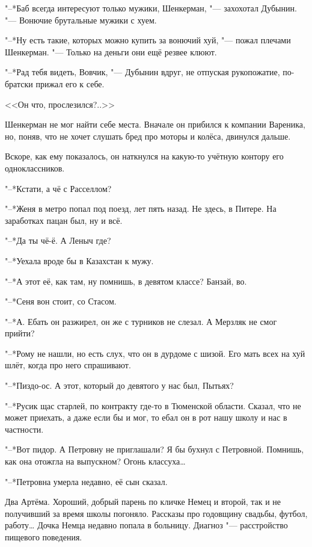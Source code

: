 "--*Баб всегда интересуют только мужики, Шенкерман, "--- захохотал Дубынин.
"--- Вонючие брутальные мужики с хуем.

"--*Ну есть такие, которых можно купить за вонючий хуй, "--- пожал плечами Шенкерман.
"--- Только на деньги они ещё резвее клюют.

"--*Рад тебя видеть, Вовчик, "--- Дубынин вдруг, не отпуская рукопожатие, по-братски прижал его к себе.

<<Он что, прослезился?..>>

\asterism

\textspace

Шенкерман не мог найти себе места.
Вначале он прибился к компании Вареника, но, поняв, что не хочет слушать бред про моторы и колёса, двинулся дальше.

Вскоре, как ему показалось, он наткнулся на какую-то учётную контору его одноклассников.

"--*Кстати, а чё с Расселлом?

"--*Женя в метро попал под поезд, лет пять назад.
Не здесь, в Питере.
На заработках пацан был, ну и всё.

"--*Да ты чё-ё.
А Леныч где?

"--*Уехала вроде бы в Казахстан к мужу.

"--*А этот её, как там, ну помнишь, в девятом классе?
Банзай, во.

"--*Сеня вон стоит, со Стасом.

"--*А.
Ебать он разжирел, он же с турников не слезал.
А Мерзляк не смог прийти?

"--*Рому не нашли, но есть слух, что он в дурдоме с шизой.
Его мать всех на хуй шлёт, когда про него спрашивают.

"--*Пиздо-ос.
А этот, который до девятого у нас был, Пытьях?

"--*Русик щас старлей, по контракту где-то в Тюменской области.
Сказал, что не может приехать, а даже если бы и мог, то ебал он в рот нашу школу и нас в частности.

"--*Вот пидор.
А Петровну не приглашали?
Я бы бухнул с Петровной.
Помнишь, как она отожгла на выпускном?
Огонь классуха\dots{}

"--*Петровна умерла недавно, её сын сказал.

Два Артёма.
Хороший, добрый парень по кличке Немец и второй, так и не получивший за время школы погоняло.
Рассказы про годовщину свадьбы, футбол, работу\dots{}
Дочка Немца недавно попала в больницу.
Диагноз "--- расстройство пищевого поведения.

